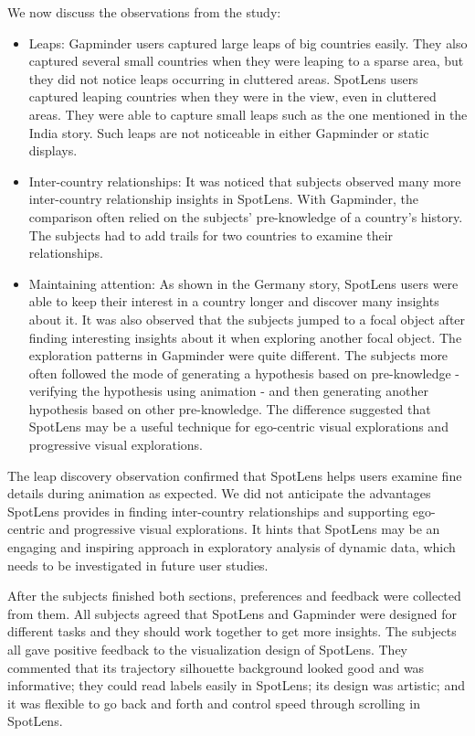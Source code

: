 \documentclass[review]{vgtc}                 %
\begin{document}
We now discuss the observations from the study:
\begin{itemize}
\item Leaps: Gapminder users captured large leaps of big countries easily. They also captured several small countries when they were leaping to a sparse area, but they did not notice leaps occurring in cluttered areas. SpotLens users captured leaping countries when they were in the view, even in cluttered areas. They were able to capture small leaps such as the one mentioned in the India story. Such leaps are not noticeable in either Gapminder or static displays.
\item Inter-country relationships: It was noticed that subjects observed many more inter-country relationship insights in SpotLens. With Gapminder, the comparison often relied on the subjects' pre-knowledge of a country's history. The subjects had to add trails for two countries to examine their relationships.
\item Maintaining attention: As shown in the Germany story, SpotLens users were able to keep their interest in a country longer and discover many insights about it. It was also observed that the subjects jumped to a focal object after finding interesting insights about it when exploring another focal object. The exploration patterns in Gapminder were quite different. The subjects more often followed the mode of generating a hypothesis based on pre-knowledge - verifying the hypothesis using animation - and then generating another hypothesis based on other pre-knowledge. The difference suggested that SpotLens may be a useful technique for ego-centric visual explorations and progressive visual explorations.
\end{itemize}

The leap discovery observation confirmed that SpotLens helps users examine fine details during animation as expected. We did not anticipate the advantages SpotLens provides in finding inter-country relationships and supporting ego-centric and progressive visual explorations. It hints that SpotLens may be an engaging and inspiring approach in exploratory analysis of dynamic data, which needs to be investigated in future user studies.

After the subjects finished both sections, preferences and feedback were collected from them. All subjects agreed that SpotLens and Gapminder were designed for different tasks and they should work together to get more insights. The subjects all gave positive feedback to the visualization design of SpotLens. They commented that its trajectory silhouette background looked good and was informative; they could read labels easily in SpotLens; its design was artistic; and it was flexible to go back and forth and control speed through scrolling in SpotLens.
\end{document}

